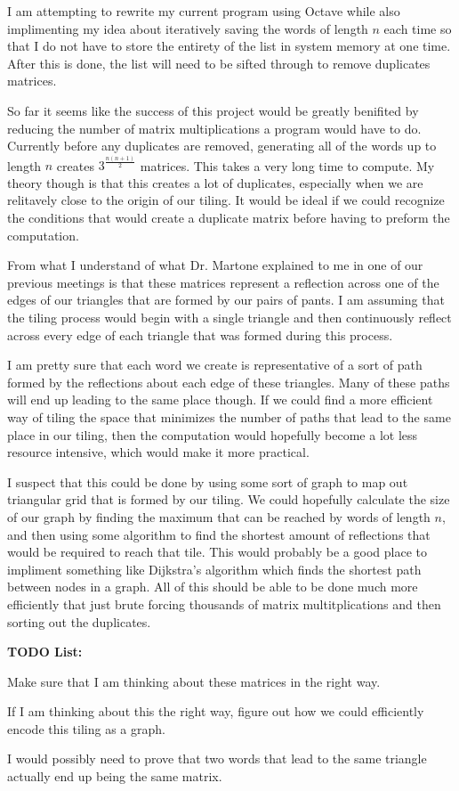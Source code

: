 \documentclass{amsart}
\begin{document}
I am attempting to rewrite my current program using Octave while also implimenting my idea about iteratively saving the words of length $n$ each time so that I do not have to store the entirety of the list in system memory at one time. After this is done, the list will need to be sifted through to remove duplicates matrices. 

So far it seems like the success of this project would be greatly benifited by reducing the number of matrix multiplications a program would have to do. Currently before any duplicates are removed, generating all of the words up to length $n$ creates $3^{\frac{n(n+1)}{2}}$ matrices. This takes a very long time to compute. My theory though is that this creates a lot of duplicates, especially when we are relitavely close to the origin of our tiling. It would be ideal if we could recognize the conditions that would create a duplicate matrix before having to preform the computation.

From what I understand of what Dr. Martone explained to me in one of our previous meetings is that these matrices represent a reflection across one of the edges of our triangles that are formed by our pairs of pants. I am assuming that the tiling process would begin with a single triangle and then continuously reflect across every edge of each triangle that was formed during this process. 

I am pretty sure that each word we create is representative of a sort of path formed by the reflections about each edge of these triangles. Many of these paths will end up leading to the same place though.  If we could find a more efficient way of tiling the space that minimizes the number of paths that lead to the same place in our tiling, then the computation would hopefully become a lot less resource intensive, which would make it more practical. 

I suspect that this could be done by using some sort of graph to map out triangular grid that is formed by our tiling. We could hopefully calculate the size of our graph by finding the maximum  that can be reached by words of length $n$, and then using some algorithm to find the shortest amount of reflections that would be required to reach that tile. This would probably be a good place to impliment something like Dijkstra's algorithm which finds the shortest path between nodes in a graph. All of this should be able to be done much more efficiently that just brute forcing thousands of matrix multitplications and then sorting out the duplicates. 

\textbf{TODO List:}
\begin{todolist}
	\item Make sure that I am thinking about these matrices in the right way.
	\item If I am thinking about this the right way, figure out how we could efficiently encode this tiling as a graph. 
	\item I would possibly need to prove that two words that lead to the same triangle actually end up being the same matrix. 
\end{todolist}

\newpage
\printbibliography
\end{document}
